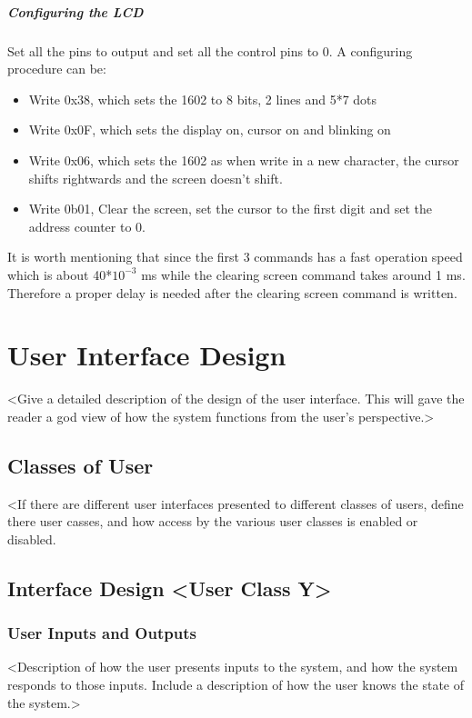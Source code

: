 \documentclass[]{report}
\begin{document}
\paragraph{Configuring the LCD}
Set all the pins to output and set all the control pins to 0. A configuring procedure can be:
\begin{itemize}
	\item Write 0x38, which sets the 1602 to 8 bits, 2 lines and 5*7 dots
	\item Write 0x0F, which sets the display on, cursor on and blinking on
	\item Write 0x06, which sets the 1602 as when write in a new character, the cursor shifts rightwards and the screen doesn't shift.
	\item Write 0b01, Clear the screen, set the cursor to the first digit and set the address counter to 0.
\end{itemize}

     It is worth mentioning that since the first 3 commands has a fast operation speed which is about 40*$10^{-3}$ ms while the clearing screen command takes around 1 ms.  Therefore a proper delay is needed after the clearing screen command is written.

\chapter{User Interface Design}
<Give a detailed description of the design of the user interface. This will gave the reader a god view of how the system functions from the user's perspective.>

\section{Classes of User}
<If there are different user interfaces presented to different classes of users, define there user casses, and how access by the various user classes is enabled or disabled.

\section{Interface Design <User Class Y>}
\subsection{User Inputs and Outputs}
<Description of how the user presents inputs to the system, and how the system responds to those inputs. Include a description of how the user knows the state of the system.>
\end{document}
